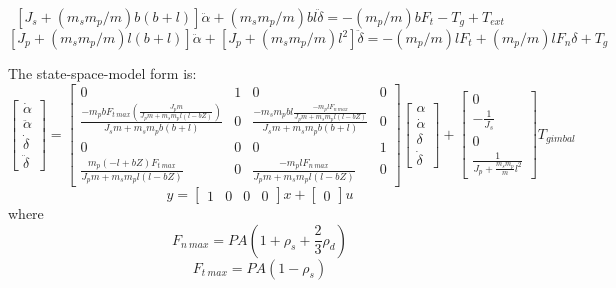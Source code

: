 \documentclass[]{aiaa-tc}%
\begin{document}
\begin{equation} \label{eq:1}
[J_s+(m_sm_p/m)b(b+l)]\ddot{\alpha}+(m_sm_p/m)bl\ddot{\delta}=-(m_p/m)bF_t-T_g+T_{ext}
\end{equation}
\begin{equation} \label{eq:2}
[J_p+(m_sm_p/m)l(b+l)]\ddot{\alpha}+[J_p+(m_sm_p/m)l^2]\ddot{\delta}=-(m_p/m)lF_t+(m_p/m)lF_n\delta+T_g
\end{equation}
	
	\vspace{5 mm}

The state-space-model form is:
	\begin{equation}
\begin{bmatrix}
\dot{\alpha }\\ 
\ddot{\alpha}\\ 
\dot{\delta }\\ 
\ddot{\delta }
\end{bmatrix}=\begin{bmatrix}
0 & 1 & 0 & 0\\ 
\frac{-m_pbF_{t\ max}(\frac{J_pm}{J_pm + {m_sm_p}l(l-bZ)})}{J_sm + m_sm_pb(b+l)} & 0 & \frac{-m_sm_pbl\frac{-m_plF_{n\ max}}{J_pm + {m_sm_p}l(l-bZ)}}{J_sm + m_sm_pb(b+l)} & 0\\ 
0 & 0 & 0 & 1\\ 
\frac{{m_p}(-l+bZ)F_{t\ max}}{J_pm + {m_sm_p}l(l-bZ)} & 0 & \frac{-m_plF_{n\ max}}{J_pm + {m_sm_p}l(l-bZ)} & 0
\end{bmatrix}
\begin{bmatrix}
\alpha\\ 
\dot{\alpha}\\ 
\delta\\ 
\dot{\delta }
\end{bmatrix}
+
\begin{bmatrix}
0\\ 
-\frac{1}{J_s}\\ 
0\\ 
\frac{1}{J_p+\frac{m_sm_p}{m}l^{2}}
\end{bmatrix}T_{gimbal}
	\end{equation}
	\begin{equation}
y = \begin{bmatrix}
1 & 0 & 0 & 0
\end{bmatrix}x+\begin{bmatrix}
0
\end{bmatrix}u
	\end{equation}
\noindent
where
	\begin{equation}
F_{n\ max}=PA(1+\rho_s+\frac{2}{3}\rho_d)
	\end{equation}
	\begin{equation}
F_{t\ max}=PA(1-\rho_s)
	\end{equation}
\end{document}
